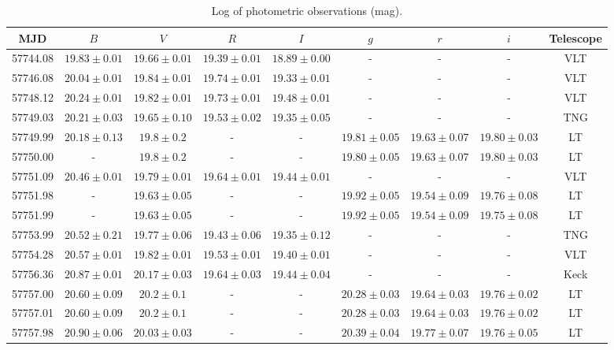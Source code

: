 \documentclass[fleqn,usenatbib]{mnras}
\begin{document}
\begin{table}
 \centering
 \caption{Log of photometric observations (mag).} 
 \small
  \begin{tabular}{ccccccccc}
  \hline
MJD & $B$ & $V$ & $R$ & $I$ & $g$ & $r$ & $i$ & Telescope\\
  \hline
57744.08 &  $19.83 \pm{0.01}$  &  $19.66 \pm{0.01}$  &  $19.39 \pm{0.01}$  &  $18.89 \pm{0.00}$  &  -  &  -  &  -  &  VLT \\
57746.08 &  $20.04 \pm{0.01}$  &  $19.84 \pm{0.01}$  &  $19.74 \pm{0.01}$  &  $19.33 \pm{0.01}$  &  -  &  -  &  -  &  VLT \\
57748.12 &  $20.24 \pm{0.01}$  &  $19.82 \pm{0.01}$  &  $19.73 \pm{0.01}$  &  $19.48 \pm{0.01}$  &  -  &  -  &  -  &  VLT \\
57749.03 &  $20.21 \pm{0.03}$ & $19.65 \pm{0.10}$ & $19.53\pm{0.02}$ & $19.35\pm{0.05}$&-&-&-&TNG\\
57749.99 &  $20.18 \pm{0.13}$  &  $19.8 \pm{0.2}$  &  -  &  -  &  $19.81 \pm{0.05}$  &  $19.63 \pm{0.07}$  &  $19.80 \pm{0.03}$  &  LT \\
57750.00 &  -  &  $19.8 \pm{0.2}$  &  -  &  -  &  $19.80 \pm{0.05}$  &  $19.63 \pm{0.07}$  &  $19.80 \pm{0.03}$  &  LT \\
57751.09 &  $20.46 \pm{0.01}$  &  $19.79 \pm{0.01}$  &  $19.64 \pm{0.01}$  &  $19.44 \pm{0.01}$  &  -  &  -  &  -  &  VLT \\
57751.98 &  -  &  $19.63 \pm{0.05}$  &  -  &  -  &  $19.92 \pm{0.05}$  &  $19.54 \pm{0.09}$  &  $19.76 \pm{0.08}$  &  LT \\
57751.99 &  -  &  $19.63 \pm{0.05}$  &  -  &  -  &  $19.92 \pm{0.05}$  &  $19.54 \pm{0.09}$  &  $19.75 \pm{0.08}$  &  LT \\
57753.99& $20.52\pm{0.21}$&$19.77\pm{0.06}$&$19.43\pm{0.06}$&$19.35\pm{0.12}$&-&-&-&TNG\\
57754.28 &  $20.57 \pm{0.01}$  &  $19.82 \pm{0.01}$  &  $19.53 \pm{0.01}$  &  $19.40 \pm{0.01}$  &  -  &  -  &  -  &  VLT \\
57756.36 &  $20.87 \pm{0.01}$  &  $20.17 \pm{0.03}$  &  $19.64 \pm{0.03}$  &  $19.44 \pm{0.04}$  &  -  &  -  &  -  &  Keck \\
57757.00 &  $20.60 \pm{0.09}$  &  $20.2 \pm{0.1}$  &  -  &  -  &  $20.28 \pm{0.03}$  &  $19.64 \pm{0.03}$  &  $19.76 \pm{0.02}$  &  LT \\
57757.01 &  $20.60 \pm{0.09}$  &  $20.2 \pm{0.1}$  &  -  &  -  &  $20.28 \pm{0.03}$  &  $19.64 \pm{0.03}$  &  $19.76 \pm{0.02}$  &  LT \\
57757.98 &  $20.90 \pm{0.06}$  &  $20.03 \pm{0.03}$  &  -  &  -  &  $20.39 \pm{0.04}$  &  $19.77 \pm{0.07}$  &  $19.76 \pm{0.05}$  &  LT \\

\end{tabular}
\end{table}
\end{document}
